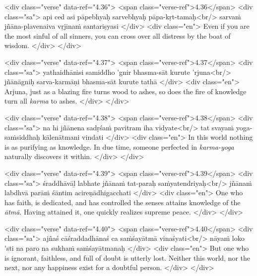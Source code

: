 \begin{html}
<div class="verse" data-ref="4.36">
  <span class="verse-ref">4.36</span>
  <div class="sa">
    api ced asi pāpebhyaḥ sarvebhyaḥ pāpa-kṛt-tamaḥ<br/>
    sarvaṁ jñāna-plavenaiva vṛjinaṁ santariṣyasi
  </div>
  <div class="en">
    Even if you are the most sinful of all sinners, you can cross over all distress by the boat of wisdom.
  </div>
</div>
\end{html}



\begin{html}
<div class="verse" data-ref="4.37">
  <span class="verse-ref">4.37</span>
  <div class="sa">
    yathaidhāṁsi samiddho ’gnir bhasma-sāt kurute ’rjuna<br/>
    jñānāgniḥ sarva-karmāṇi bhasma-sāt kurute tathā
  </div>
  <div class="en">
    Arjuna, just as a blazing fire turns wood to ashes, so does the fire of knowledge turn all \textit{karma} to ashes.
  </div>
</div>
\end{html}



\begin{html}
<div class="verse" data-ref="4.38">
  <span class="verse-ref">4.38</span>
  <div class="sa">
    na hi jñānena sadṛśaṁ pavitram iha vidyate<br/>
    tat svayaṁ yoga-saṁsiddhaḥ kālenātmani vindati
  </div>
  <div class="en">
    In this world nothing is as purifying as knowledge. In due time, someone perfected in \textit{karma-yoga} naturally discovers it within.
  </div>
</div>
\end{html}



\begin{html}
<div class="verse" data-ref="4.39">
  <span class="verse-ref">4.39</span>
  <div class="sa">
    śraddhāvāḻ labhate jñānaṁ tat-paraḥ saṁyatendriyaḥ<br/>
    jñānaṁ labdhvā parāṁ śāntim acireṇādhigacchati
  </div>
  <div class="en">
    One who has faith, is dedicated, and has controlled the senses attains knowledge of the \textit{ātmā}. Having attained it, one quickly realizes supreme peace.
  </div>
</div>
\end{html}



\begin{html}
<div class="verse" data-ref="4.40">
  <span class="verse-ref">4.40</span>
  <div class="sa">
    ajñaś cāśraddadhānaś ca saṁśayātmā vinaśyati<br/>
    nāyaṁ loko ’sti na paro na sukhaṁ saṁśayātmanaḥ
  </div>
  <div class="en">
    But one who is ignorant, faithless, and full of doubt is utterly lost. Neither this world, nor the next, nor any happiness exist for a doubtful person.
  </div>
</div>
\end{html}




